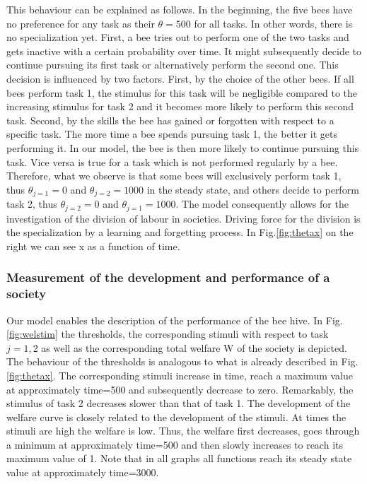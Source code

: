 This behaviour can be explained as follows. In the beginning, the five bees have no preference for any task as their $\theta=500$ for all tasks. In other words, there is no specialization yet. First, a bee tries out to perform one of the two tasks and gets inactive with a certain probability over time. It might subsequently decide to continue pursuing its first task or alternatively perform the second one. This decision is influenced by two factors. First, by the choice of the other bees. If all bees perform task 1, the stimulus for this task will be negligible compared to the increasing stimulus for task 2 and it becomes more likely to perform this second task. Second, by the skills the bee has gained or forgotten with respect to a specific task. The more time a bee spends pursuing task 1, the better it gets performing it. In our model, the bee is then more likely to continue pursuing this task. Vice versa is true for a task which is not performed regularly by a bee. Therefore, what we observe is that some bees will exclusively perform task 1, thus $\theta_{j=1}=0$ and $\theta_{j=2}=1000$ in the steady state, and others decide to perform task 2, thus $\theta_{j=2}=0$ and $\theta_{j=1}=1000$. The model consequently allows for the investigation of the division of labour in societies. Driving force for the division is the specialization by a learning and forgetting process.
In Fig.\ref{fig:thetax}  on the right we can see x as a function of time.

\subsubsection{Measurement of the development and performance of a society}
Our model enables the description of the performance of the bee hive. In Fig.\ref{fig:welstim} the thresholds, the corresponding stimuli with respect to task $j=1, 2$ as well as the corresponding total welfare W of the society is depicted. The behaviour of the thresholds is analogous to what is already described in Fig.\ref{fig:thetax}. The corresponding stimuli increase in time, reach a maximum value at approximately time=500 and subsequently decrease to zero. Remarkably, the stimulus of task 2 decreases slower than that of task 1. The development of the welfare curve is closely related to the development of the stimuli. At times the stimuli are high the welfare is low. Thus, the welfare first decreases, goes through a minimum at approximately time=500 and then slowly increases to reach its maximum value of 1. Note that in all graphs all functions reach its steady state value at approximately time=3000.

